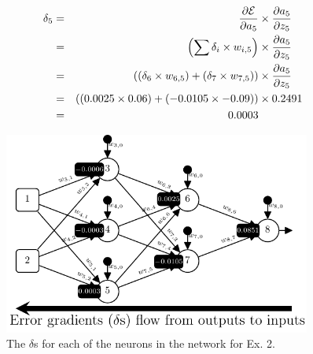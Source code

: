 \documentclass[xcolor={table}]{beamer}
\begin{document}
 \begin{frame} 
\begin{alignat}{3}
\delta_5 & = & \frac{\partial \mathcal{E}}{\partial a_5} &\times \frac{\partial a_5}{\partial z_5} \notag\\
& = & \left(\sum \delta_i \times w_{i,5}\right) &\times \frac{\partial a_5}{\partial z_5} \notag\\
& = & \left(\left(\delta_6 \times w_{6,5}\right) + \left(\delta_7 \times w_{7,5}\right) \right) &\times \frac{\partial a_5}{\partial z_5} \notag\\
& = & \left(\left(0.0025 \times 0.06\right) + \left({-0.0105} \times -0.09\right) \right) &\times 0.2491\notag\\
& = & 0.0003
\label{eq:delta5}
\end{alignat}
\end{frame} 



 \begin{frame} 
\begin{figure}[t]
\centerline{
\includegraphics[width=0.9\textwidth]{./images/fmlpda_8_16.pdf}
}
\caption{The $\delta$s for each of the neurons in the network for Ex. 2.} 
\label{fig:networkdeltasEx2}
\end{figure}
\end{frame} 
\end{document}
